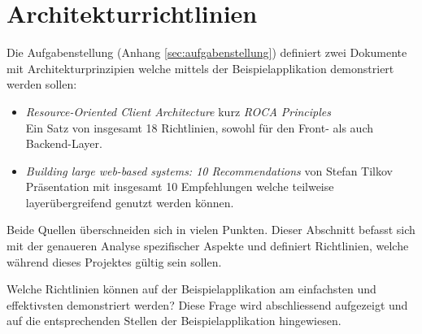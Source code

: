 \section{Architekturrichtlinien}
\label{sec:architekturrichtlinien}

Die Aufgabenstellung (Anhang \ref{sec:aufgabenstellung}) definiert zwei Dokumente mit Architekturprinzipien welche mittels der Beispielapplikation demonstriert werden sollen:

\begin{itemize}
	\item \textit{Resource-Oriented Client Architecture} kurz \textit{ROCA Principles} \cite{ROCA}\\
	Ein Satz von insgesamt 18 Richtlinien, sowohl für den Front- als auch Backend-Layer.
	\item \textit{Building large web-based systems: 10 Recommendations} von Stefan Tilkov \cite{TilkovSlides}\\
	Präsentation mit insgesamt 10 Empfehlungen welche teilweise layerübergreifend genutzt werden können.
\end{itemize}

Beide Quellen überschneiden sich in vielen Punkten. Dieser Abschnitt befasst sich mit der genaueren Analyse spezifischer Aspekte und definiert Richtlinien, welche während dieses Projektes gültig sein sollen.

Welche Richtlinien können auf der Beispielapplikation am einfachsten und effektivsten demonstriert werden? Diese Frage wird abschliessend aufgezeigt und auf die entsprechenden Stellen der Beispielapplikation hingewiesen.








\newpage
